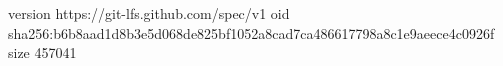 version https://git-lfs.github.com/spec/v1
oid sha256:b6b8aad1d8b3e5d068de825bf1052a8cad7ca486617798a8c1e9aeece4c0926f
size 457041
